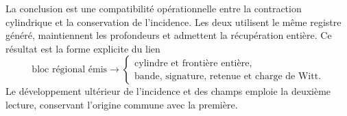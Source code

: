 La conclusion est une compatibilité opérationnelle entre la contraction
cylindrique et la conservation de l'incidence. Les deux utilisent le même
registre généré, maintiennent les profondeurs et admettent la récupération
entière. Ce résultat est la forme explicite du lien
\[
 \text{bloc régional émis}
 \longrightarrow
 \begin{cases}
 \text{cylindre et frontière entière},\\
 \text{bande, signature, retenue et charge de Witt}.
 \end{cases}
\]
Le développement ultérieur de l'incidence et des champs emploie la deuxième lecture, conservant l'origine commune avec la première.
